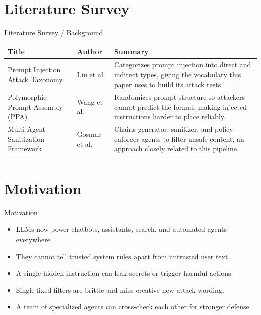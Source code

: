 \documentclass[10pt]{beamer}
\begin{document}
\section{Literature Survey}
\begin{frame}{Literature Survey / Background}
  \small
  \begin{tabular}{@{}p{2.7cm}p{2.3cm}p{5.6cm}@{}}
    \toprule
    \textbf{Title} & \textbf{Author} & \textbf{Summary} \\
    \midrule
    Prompt Injection Attack Taxonomy & Liu et al. & Categorizes prompt injection into direct and indirect types, giving the vocabulary this paper uses to build its attack tests. \\
    \addlinespace
    Polymorphic Prompt Assembly (PPA) & Wang et al. & Randomizes prompt structure so attackers cannot predict the format, making injected instructions harder to place reliably. \\
    \addlinespace
    Multi-Agent Sanitization Framework & Gosmar et al. & Chains generator, sanitizer, and policy-enforcer agents to filter unsafe content, an approach closely related to this pipeline. \\
    \addlinespace
    \bottomrule
  \end{tabular}
\end{frame}
\section{Motivation}
\begin{frame}{Motivation}
\begin{itemize}
  \item LLMs now power chatbots, assistants, search, and automated agents everywhere.
  \item They cannot tell trusted system rules apart from untrusted user text.
  \item A single hidden instruction can leak secrets or trigger harmful actions.
  \item Single fixed filters are brittle and miss creative new attack wording.
  \item A team of specialized agents can cross-check each other for stronger defense.
\end{itemize}
\end{frame}
\end{document}
